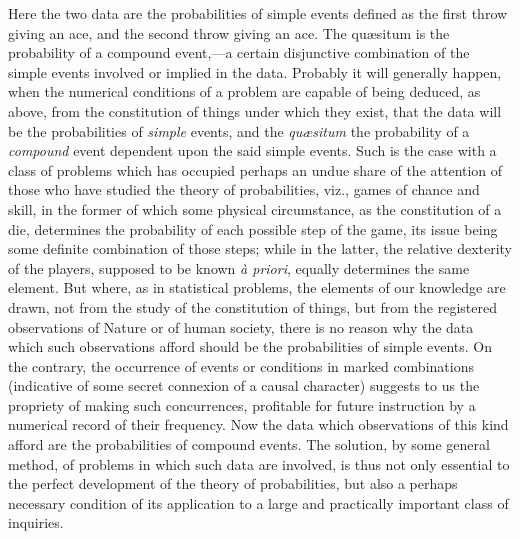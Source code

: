 \documentclass[oneside]{book}
\begin{document}
Here the two data are the probabilities of simple events defined
as the first throw giving an ace, and the second throw
giving an ace. The qu\ae{}situm is the probability of a compound
event,---a certain disjunctive combination of the simple events
involved or implied in the data. Probably it will generally happen,
when the numerical conditions of a problem are capable of
being deduced, as above, from the constitution of things under
which they exist, that the data will be the probabilities of \emph{simple}
events, and the \textit{qu\ae{}situm} the probability of a \emph{compound} event
dependent upon the said simple events. Such is the case with a
class of problems which has occupied perhaps an undue share of
the attention of those who have studied the theory of probabilities,
viz., games of chance and skill, in the former of which some
physical circumstance, as the constitution of a die, determines
the probability of each possible step of the game, its issue being
some definite combination of those steps; while in the latter, the
relative dexterity of the players, supposed to be known \textit{\`{a} priori},
equally determines the same element. But where, as in statistical
problems, the elements of our knowledge are drawn, not from
the study of the constitution of things, but from the registered
observations of Nature or of human society, there is no reason
why the data which such observations afford should be the probabilities
of simple events. On the contrary, the occurrence of
events or conditions in marked combinations (indicative of some
secret connexion of a causal character) suggests to us the propriety
of making such concurrences, profitable for future instruction
by a numerical record of their frequency. Now the data
which observations of this kind afford are the probabilities of
compound events. The solution, by some general method, of
problems in which such data are involved, is thus not only essential
to the perfect development of the theory of probabilities, but
also a perhaps necessary condition of its application to a large
and practically important class of inquiries.
\end{document}
